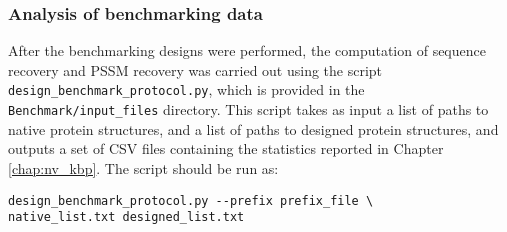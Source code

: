 \subsubsection{Analysis of benchmarking data}

After the benchmarking designs were performed, the computation of sequence recovery and \ac{PSSM} recovery was carried out using the script\\
\texttt{design\_benchmark\_protocol.py}, which is provided in the\\
\texttt{Benchmark/input\_files} directory.
This script takes as input a list of paths to native protein structures, and a list of paths to designed protein structures, and outputs a set of \ac{CSV} files containing the statistics reported in Chapter \ref{chap:nv_kbp}.
The script should be run as:

\singlespace
\begin{Verbatim}
design_benchmark_protocol.py --prefix prefix_file \
native_list.txt designed_list.txt
\end{Verbatim}
\doublespace
